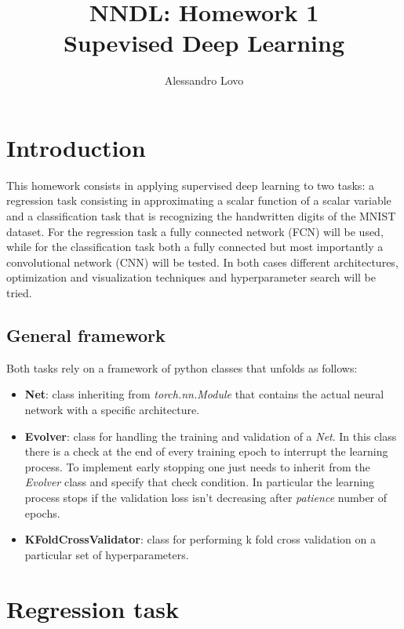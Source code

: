 \documentclass[a4paper, 11pt]{article}
\begin{document}
\title{NNDL: Homework 1 \\ Supevised Deep Learning}
\author{Alessandro Lovo}
\maketitle

\section{Introduction}
  This homework consists in applying supervised deep learning to two tasks: a regression task consisting in approximating a scalar function of a scalar variable and a classification task that is recognizing the handwritten digits of the MNIST dataset. For the regression task a fully connected network (FCN) will be used, while for the classification task both a fully connected but most importantly a convolutional network (CNN) will be tested. In both cases different architectures, optimization and visualization techniques and hyperparameter search will be tried.

  \subsection{General framework}
    Both tasks rely on a framework of python classes that unfolds as follows:
    \begin{itemize}
      \item \textbf{Net}: class inheriting from \emph{torch.nn.Module} that contains the actual neural network with a specific architecture.
      \item \textbf{Evolver}: class for handling the training and validation of a \emph{Net}. In this class there is a check at the end of every training epoch to interrupt the learning process. To implement early stopping one just needs to inherit from the \emph{Evolver} class and specify that check condition. In particular the learning process stops if the validation loss isn't decreasing after \emph{patience} number of epochs.
      \item \textbf{KFoldCrossValidator}: class for performing k fold cross validation on a particular set of hyperparameters.
    \end{itemize}

\section{Regression task}
\end{document}
